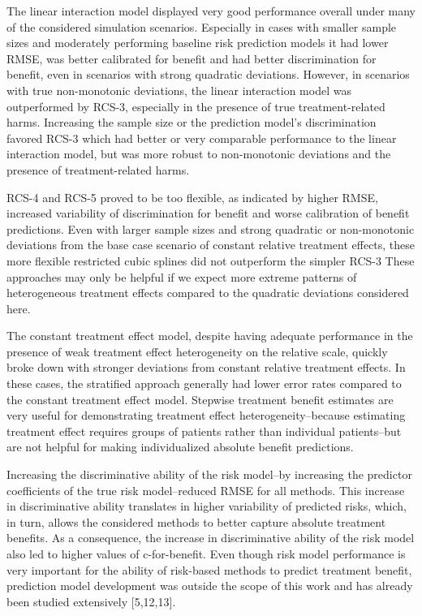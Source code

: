 \documentclass{article}
\begin{document}
The linear interaction model displayed very good performance overall
under many of the considered simulation scenarios. Especially in cases
with smaller sample sizes and moderately performing baseline risk
prediction models it had lower RMSE, was better calibrated for benefit
and had better discrimination for benefit, even in scenarios with strong
quadratic deviations. However, in scenarios with true non-monotonic
deviations, the linear interaction model was outperformed by RCS-3,
especially in the presence of true treatment-related harms. Increasing
the sample size or the prediction model's discrimination favored RCS-3
which had better or very comparable performance to the linear
interaction model, but was more robust to non-monotonic deviations and
the presence of treatment-related harms.

RCS-4 and RCS-5 proved to be too flexible, as indicated by higher RMSE,
increased variability of discrimination for benefit and worse
calibration of benefit predictions. Even with larger sample sizes and
strong quadratic or non-monotonic deviations from the base case scenario
of constant relative treatment effects, these more flexible restricted
cubic splines did not outperform the simpler RCS-3 These approaches may
only be helpful if we expect more extreme patterns of heterogeneous
treatment effects compared to the quadratic deviations considered here.

The constant treatment effect model, despite having adequate performance
in the presence of weak treatment effect heterogeneity on the relative
scale, quickly broke down with stronger deviations from constant
relative treatment effects. In these cases, the stratified approach
generally had lower error rates compared to the constant treatment
effect model. Stepwise treatment benefit estimates are very useful for
demonstrating treatment effect heterogeneity--because estimating
treatment effect requires groups of patients rather than individual
patients--but are not helpful for making individualized absolute benefit
predictions.

Increasing the discriminative ability of the risk model--by increasing
the predictor coefficients of the true risk model--reduced RMSE for all
methods. This increase in discriminative ability translates in higher
variability of predicted risks, which, in turn, allows the considered
methods to better capture absolute treatment benefits. As a consequence,
the increase in discriminative ability of the risk model also led to
higher values of c-for-benefit. Even though risk model performance is
very important for the ability of risk-based methods to predict
treatment benefit, prediction model development was outside the scope of
this work and has already been studied extensively {[}5,12,13{]}.
\end{document}
